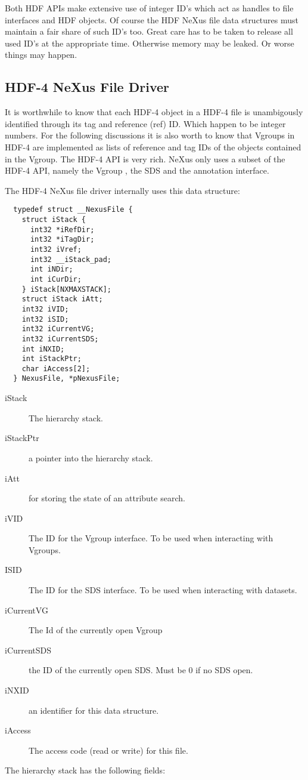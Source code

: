 \documentclass[a4paper]{article}
\begin{document}
Both HDF APIs make extensive use of integer ID's which act as handles to file interfaces and HDF objects. Of 
course the HDF NeXus file data structures must maintain a fair share of such ID's too. Great care has to be 
taken to release all used ID's at the appropriate time. Otherwise memory may be leaked. Or worse things 
may happen.  
  


\subsection{HDF-4 NeXus File Driver }
It is worthwhile to know that each HDF-4 object in a HDF-4 file is unambigously identified through its tag and 
reference (ref) ID.  Which happen to be integer numbers. For the following discussions it is also worth to
know that Vgroups in HDF-4 are implemented as lists of reference and tag IDs of the objects contained in the 
Vgroup. The HDF-4 API is very rich. NeXus only uses a subset of the HDF-4 API, namely the Vgroup , the SDS  and 
the annotation interface.   


The HDF-4 NeXus file driver internally uses this data structure:
\begin{verbatim}
  typedef struct __NexusFile {
    struct iStack {
      int32 *iRefDir;
      int32 *iTagDir;
      int32 iVref;
      int32 __iStack_pad;               
      int iNDir;
      int iCurDir;
    } iStack[NXMAXSTACK];
    struct iStack iAtt;
    int32 iVID;
    int32 iSID;
    int32 iCurrentVG;
    int32 iCurrentSDS;
    int iNXID;
    int iStackPtr;
    char iAccess[2];
  } NexusFile, *pNexusFile;
\end{verbatim}


\begin{description}\item[iStack
]  The hierarchy stack.
\item[iStackPtr
]  a pointer into the hierarchy stack.
\item[iAtt
]  for storing the state of an attribute search. 
\item[iVID
]  The ID for the Vgroup interface. To be used when interacting with Vgroups.
\item[ISID
]  The ID for the SDS interface. To be used when interacting with datasets.
\item[iCurrentVG
]  The Id of the currently open Vgroup
\item[iCurrentSDS
]  the ID of the currently open SDS. Must be 0 if no SDS open.
\item[iNXID
]  an identifier for this data structure. 
\item[iAccess
]  The access code (read or write) for this file.
\end{description}The hierarchy stack has the following fields:
\end{document}
